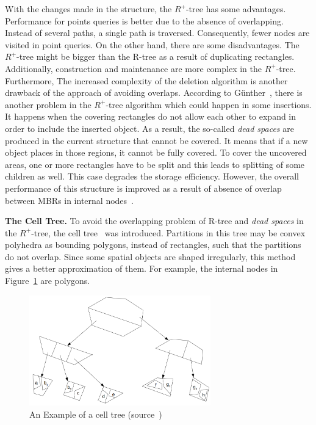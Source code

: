 \documentclass[a4paper,12pt]{article}
\begin{document}
With the changes made in the structure, the $R^+$-tree has some advantages. Performance for points
queries is better due to the absence of overlapping. Instead of several paths, a single path is traversed. Consequently, fewer nodes are visited in point queries. On the other hand, there are some disadvantages. 
The {$R^+$-tree} might be bigger than the R-tree as a result of duplicating rectangles. Additionally, construction and maintenance are more complex in the {$R^+$-tree}. Furthermore, The increased complexity of the deletion algorithm is another drawback of the approach of avoiding overlaps. 
According to G{\"u}nther~\cite{efficientstruct}, there is another problem in the {$R^+$-tree} algorithm which could happen in some insertions. It happens when the covering rectangles do not allow each other to expand in order to include the inserted object. As a result, the so-called \textit{dead spaces} are produced in the current structure that cannot be covered. It means that if a new object places in those regions, it cannot be fully covered. To cover the uncovered areas, one or more rectangles have to be split and this leads to splitting of some children as well. This case degrades the storage efficiency. %
However, the overall performance of this structure is improved as a result of absence of overlap between MBRs in internal nodes~\cite{Papadopoulos2010}.

\textbf{The Cell Tree.}
To avoid the overlapping problem of R-tree and \textit{dead spaces} in the $R^+$-tree, the cell tree~\cite{celltree} was introduced. Partitions in this tree may be convex polyhedra as bounding polygons, instead of rectangles, such that the partitions do not overlap. 
Since some spatial objects are shaped irregularly, this method gives a better approximation of them.
For example, the internal nodes in Figure~\ref{figcelltree} are polygons. 
\begin{figure}
\centering
\includegraphics[width=0.7\textwidth]{CellTree}
\caption{An Example of a cell tree (source~\cite{survey})}
\label{figcelltree}
\end{figure} 
\end{document}
